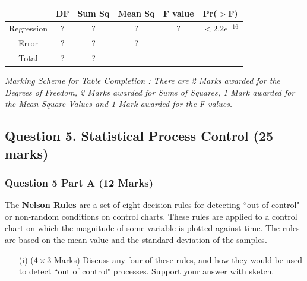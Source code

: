 \documentclass[a4paper,12pt]{article}
\begin{document}
\begin{center}
	\begin{tabular}{|c|c|c|c|c|c|} \hline
	\phantom{makespace}	& DF & 	Sum Sq &	Mean Sq &	F value &   	Pr($>$F)    \\ \hline
		Regression &  \phantom{make}?\phantom{make} &	? &	? &	 ? &	$< 2.2e^{-16}$ \\ \hline
		Error  & ? &	? &  	?   &            &       \\ \hline
		Total  & ?  &	? &  \phantom{makespace}	  &   \phantom{makespace}         &    \phantom{makespace}    \\ \hline
	\end{tabular} 
\end{center}

\noindent \textit{Marking Scheme for Table Completion : There are 2 Marks awarded for the Degrees of Freedom, 2 Marks awarded for Sums of Squares, 1 Mark awarded for the Mean Square Values and 1 Mark awarded for the F-values.}

\newpage


\subsection*{Question 5. Statistical Process Control (25 marks) }

\subsubsection*{Question 5 Part A (12 Marks)}
The \textbf{Nelson Rules} are a set of eight decision rules for detecting ``out-of-control" or non-random conditions on control charts. These rules are applied to a control chart on which the magnitude of some variable is plotted against time. The rules are based on the mean value and the standard deviation of the samples.\\

\begin{itemize}
	\item[(i)] ($4 \times 3$ Marks) Discuss any four of these rules, and how they would be used to detect ``out of control" processes. Support your answer with sketch.
\end{itemize}
\end{document}
